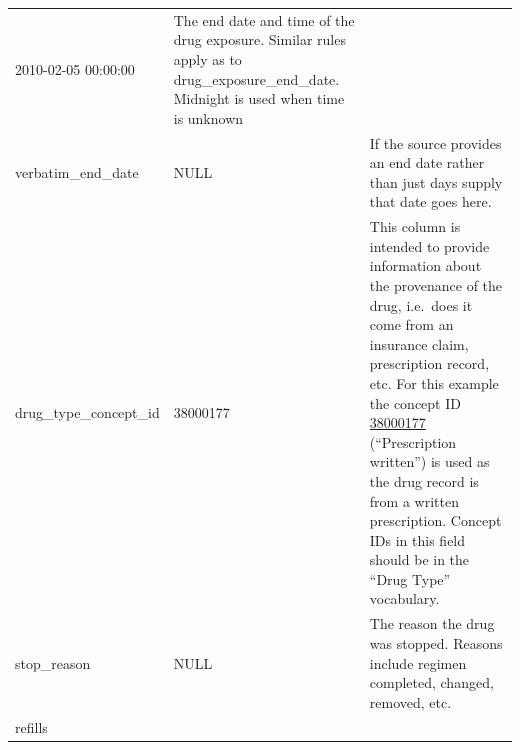 \documentclass[11pt]{book}
\theoremstyle{definition}
\theoremstyle{definition}
\theoremstyle{definition}
\theoremstyle{remark}
\begin{document}
\begin{longtable}[]{@{}lll@{}}
\begin{minipage}[t]{0.15\columnwidth}
2010-02-05 00:00:00\strut
\end{minipage} & \begin{minipage}[t]{0.49\columnwidth}\raggedright
The end date and time of the drug exposure. Similar rules apply as to drug\_exposure\_end\_date. Midnight is used when time is unknown\strut
\end{minipage}\tabularnewline
\begin{minipage}[t]{0.28\columnwidth}\raggedright
verbatim\_end\_date\strut
\end{minipage} & \begin{minipage}[t]{0.15\columnwidth}\raggedright
NULL\strut
\end{minipage} & \begin{minipage}[t]{0.49\columnwidth}\raggedright
If the source provides an end date rather than just days supply that date goes here.\strut
\end{minipage}\tabularnewline
\begin{minipage}[t]{0.28\columnwidth}\raggedright
drug\_type\_concept\_id\strut
\end{minipage} & \begin{minipage}[t]{0.15\columnwidth}\raggedright
38000177\strut
\end{minipage} & \begin{minipage}[t]{0.49\columnwidth}\raggedright
This column is intended to provide information about the provenance of the drug, i.e.~does it come from an insurance claim, prescription record, etc. For this example the concept ID \href{http://athena.ohdsi.org/search-terms/terms/38000177}{38000177} (``Prescription written'') is used as the drug record is from a written prescription. Concept IDs in this field should be in the ``Drug Type'' vocabulary.\strut
\end{minipage}\tabularnewline
\begin{minipage}[t]{0.28\columnwidth}\raggedright
stop\_reason\strut
\end{minipage} & \begin{minipage}[t]{0.15\columnwidth}\raggedright
NULL\strut
\end{minipage} & \begin{minipage}[t]{0.49\columnwidth}\raggedright
The reason the drug was stopped. Reasons include regimen completed, changed, removed, etc.\strut
\end{minipage}\tabularnewline
\begin{minipage}[t]{0.28\columnwidth}\raggedright
refills\strut
\end{minipage} & \begin{minipage}[t]{0.15\columnwidth}\raggedright

\end{minipage}
\end{longtable}
\end{document}

